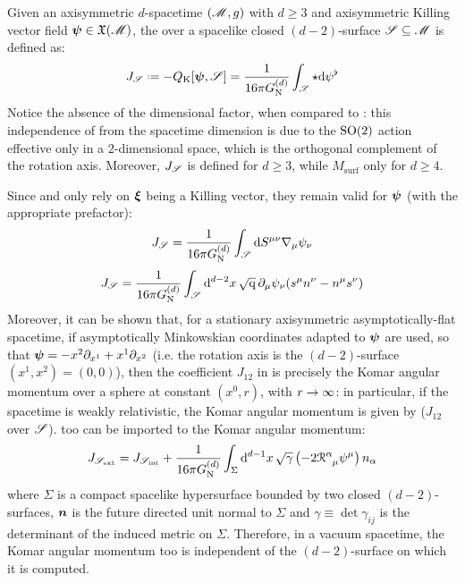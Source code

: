 Given an axisymmetric $ d $-spacetime $ (\mathscr{M} , g) $ with $ d \geq 3 $ and axisymmetric Killing vector field $ \boldsymbol{\psi} \in \mathfrak{X}(\mathscr{M}) $, the  over a spacelike closed $ (d-2) $-surface $ \mathscr{S} \subseteq \mathscr{M} $ is defined as:
\begin{equation}
  J_\surf \defeq - Q_\text{K}[\pb , \surf] = \frac{1}{16 \pi \gd} \int_\surf \star \dd \psi^\flat
  \label{eq:komar-angular-momentum}
\end{equation}
Notice the absence of the dimensional factor, when compared to : this independence of  from the spacetime dimension is due to the $ \mathrm{SO}(2) $ action effective only in a $ 2 $-dimensional space, which is the orthogonal complement of the rotation axis. Moreover, $ J_\mathscr{S} $ is defined for $ d \geq 3 $, while $ M_\text{surf} $ only for $ d \geq 4 $.

Since  and  only rely on $ \boldsymbol{\xi} $ being a Killing vector, they remain valid for $ \boldsymbol{\psi} $ (with the appropriate prefactor):
\begin{equation}
  J_\mathscr{S} = \frac{1}{16 \pi G_\text{N}^{(d)}} \int_\mathscr{S} \mathrm{d} S^{\mu \nu} \nabla_\mu \psi_\nu
  \label{eq:komar-angular-momentum-flux}
\end{equation}
\begin{equation}
  J_\mathscr{S} = \frac{1}{16 \pi G_\text{N}^{(d)}} \int_\mathscr{S} \mathrm{d}^{d-2} x \, \sqrt{\mathrm{q}} \, \partial_\mu \psi_\nu (s^\mu n^\nu - n^\mu s^\nu)
  \label{eq:komar-angular-momentum-flux-alt}
\end{equation}
Moreover, it can be shown that, for a stationary axisymmetric asymptotically-flat spacetime, if asymptotically Minkowskian coordinates adapted to $ \boldsymbol{\psi} $ are used, so that $ \boldsymbol{\psi} = - x^2 \partial_{x^1} + x^1 \partial_{x^2} $ (i.e. the rotation axis is the $ (d-2) $-surface $ (x^1 , x^2) = (0,0) $), then the coefficient $ J_{12} $ in  is precisely the Komar angular momentum over a sphere at constant $ (x^0 , r) $, with $ r \rightarrow \infty $: in particular, if the spacetime is weakly relativistic, the Komar angular momentum is given by  ($ J_{12} $ over $ \mathscr{S} $).
 too can be imported to the Komar angular momentum:
\begin{equation}
  J_{\surf_\text{ext}} = J_{\surf_\text{int}} + \frac{1}{16 \pi \gd} \int_\Sigma \dd^{d-1} x \, \sqrt{\gamma} \left( -2 \tensor{\rr}{^\alpha_\mu} \psi^\mu \right) n_\alpha
\end{equation}
where $ \Sigma $ is a compact spacelike hypersurface bounded by two closed $ (d-2) $-surfaces, $ \boldsymbol{n} $ is the future directed unit normal to $ \Sigma $ and $ \gamma \equiv \det \gamma_{ij} $ is the determinant of the induced metric on $ \Sigma $. Therefore, in a vacuum spacetime, the Komar angular momentum too is independent of the $ (d-2) $-surface on which it is computed.

